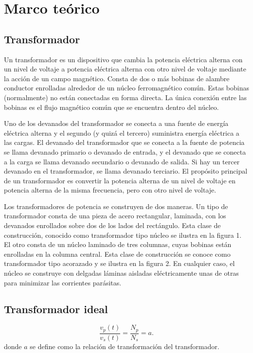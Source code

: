 \documentclass[12pt,a4paper]{article}
\begin{document}
\section{Marco teórico}
\subsection{Transformador}
Un transformador es un dispositivo que cambia la potencia eléctrica alterna con un nivel de voltaje a potencia eléctrica alterna con otro nivel de voltaje mediante la acción de un campo magnético. Consta de dos o más bobinas de alambre conductor enrolladas alrededor de un núcleo ferromagnético común. Estas bobinas (normalmente) no están conectadas en forma directa. La única conexión entre las bobinas es el flujo magnético común que se encuentra dentro del núcleo.

Uno de los devanados del transformador se conecta a una fuente de energía eléctrica alterna y el segundo (y quizá el tercero) suministra energía eléctrica a las cargas. El devanado del transformador que se conecta a la fuente de potencia se llama devanado primario o devanado de entrada, y el devanado que se conecta a la carga se llama devanado secundario o devanado de salida. Si hay un tercer devanado en el transformador, se llama devanado terciario. El propósito principal de un transformador es convertir la potencia alterna de un nivel de voltaje en potencia alterna de la misma frecuencia, pero con otro nivel de voltaje.

Los transformadores de potencia se construyen de dos maneras. Un tipo de transformador consta de una pieza de acero rectangular, laminada, con los devanados enrollados sobre dos de los lados del rectángulo. Esta clase de construcción, conocido como transformador tipo núcleo se ilustra en la figura 1. El otro consta de un núcleo laminado de tres columnas, cuyas bobinas están enrolladas en la columna central. Esta clase de construcción se conoce como transformador tipo acorazado y se ilustra en la figura 2. En cualquier caso, el núcleo se construye con delgadas láminas aisladas eléctricamente unas de otras para minimizar las corrientes parásitas.
\subsection{Transformador ideal}
\begin{equation*}
\frac{v_p(t)}{v_s(t)}=\frac{N_p}{N_s}=a.
\end{equation*}
donde $a$ se define como la relación de transformación del transformador.
\end{document}
